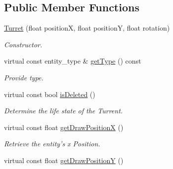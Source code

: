 \subsection*{Public Member Functions}
\begin{DoxyCompactItemize}
\item 
\hypertarget{class_turret_ad4865ea38c314056d61968609773ec46}{\hyperlink{class_turret_ad4865ea38c314056d61968609773ec46}{Turret} (float position\+X, float position\+Y, float rotation)}\label{class_turret_ad4865ea38c314056d61968609773ec46}

\begin{DoxyCompactList}\small\item\em Constructor. \end{DoxyCompactList}\item 
\hypertarget{class_turret_a4998bf256706dc75926e683f08862b80}{virtual const entity\+\_\+type \& \hyperlink{class_turret_a4998bf256706dc75926e683f08862b80}{get\+Type} () const }\label{class_turret_a4998bf256706dc75926e683f08862b80}

\begin{DoxyCompactList}\small\item\em Provide type. \end{DoxyCompactList}\item 
\hypertarget{class_turret_a204a0c45ddcc9139cda14dcd1493fd86}{virtual const bool \hyperlink{class_turret_a204a0c45ddcc9139cda14dcd1493fd86}{is\+Deleted} ()}\label{class_turret_a204a0c45ddcc9139cda14dcd1493fd86}

\begin{DoxyCompactList}\small\item\em Determine the life state of the Turrent. \end{DoxyCompactList}\item 
\hypertarget{class_turret_aecf0bc7d827c8f05f48b730daf00d9e4}{virtual const float \hyperlink{class_turret_aecf0bc7d827c8f05f48b730daf00d9e4}{get\+Draw\+Position\+X} ()}\label{class_turret_aecf0bc7d827c8f05f48b730daf00d9e4}

\begin{DoxyCompactList}\small\item\em Retrieve the entity's x Position. \end{DoxyCompactList}\item 
\hypertarget{class_turret_ab86c156ea9ba76d33458601aa0eb454b}{virtual const float \hyperlink{class_turret_ab86c156ea9ba76d33458601aa0eb454b}{get\+Draw\+Position\+Y} ()}\label{class_turret_ab86c156ea9ba76d33458601aa0eb454b}


\end{DoxyCompactItemize}
